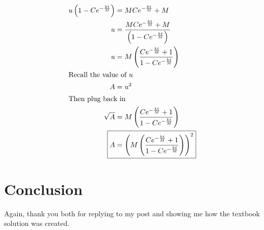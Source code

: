 \documentclass[12pt]{article}
\begin{document}
\begin{align}
  u\left(1-Ce^{-\frac{kt}{M}}\right)                                               & =MCe^{-\frac{kt}{M}}+M                                                             \\
  u                                                                                & =\frac{MCe^{-\frac{kt}{M}}+M}{\left(1-Ce^{-\frac{kt}{M}}\right)}                   \\
  u                                                                                & =M\left(\frac{Ce^{-\frac{kt}{M}}+1}{1-Ce^{-\frac{kt}{M}}}\right)                   \\
  \intertext{Recall the value of $u$}
  A                                                                                & =u^{2}                                                                             \\
  \intertext{Then plug back in}
  \sqrt{A}                                                                         & =M\left(\frac{Ce^{-\frac{kt}{M}}+1}{1-Ce^{-\frac{kt}{M}}}\right)                   \\
  \Aboxed{
  A                                                                                & =\left(M\left(\frac{Ce^{-\frac{kt}{M}}+1}{1-Ce^{-\frac{kt}{M}}}\right)\right)^{2}}
\end{align}

\section{Conclusion}
Again, thank you both for replying to my post and showing me how the textbook solution was created.
\end{document}
